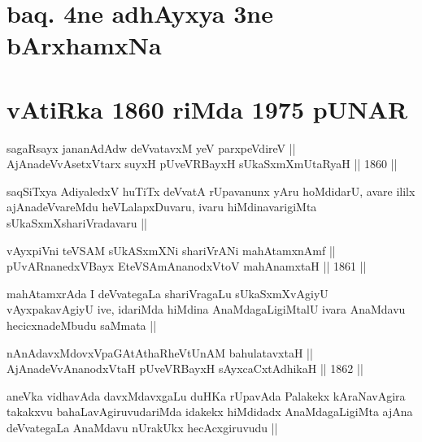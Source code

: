 \section*{baq. 4ne adhAyxya 3ne bArxhamxNa}

\section*{vAtiRka 1860 riMda 1975 pUNAR}


\begin{shl}
sagaRsayx jananAdAdw deVvatavxM yeV parxpeVdireV || \\
AjAnadeVvAsetxV\s tarx suyxH pUveVRBayxH sUkaSxmXmUtaRyaH ||  1860 ||  
\end{shl}

\begin{artha}
saqSiTxya AdiyaledxV huTiTx deVvatA rUpavanunx yAru hoMdidarU, avare
ililx ajAnadeVvareMdu heVLalapxDuvaru, ivaru hiMdinavarigiMta
sUkaSxmXshariVradavaru ||
\end{artha}


\begin{shl}
vAyxpiVni teVSAM sUkASxmXNi shariVrANi mahAtamxnAmf || \\
pUvARnanedxVBayx EteVSAmAnanodxV\s toV mahAnamxtaH ||  1861 ||  
\end{shl}

\begin{artha}
mahAtamxrAda I deVvategaLa shariVragaLu sUkaSxmXvAgiyU vAyxpakavAgiyU
ive, idariMda hiMdina AnaMdagaLigiMtalU ivara AnaMdavu hecicxnadeMbudu
saMmata ||
\end{artha}

\begin{shl}
nAnAdavxMdovxVpaGAtAthaRheVtUnAM bahulatavxtaH || \\
AjAnadeVvAnanodxV\s taH pUveVRBayxH sAyxcaCxtAdhikaH ||  1862 ||  
\end{shl}

\begin{artha}
aneVka vidhavAda davxMdavxgaLu duHKa rUpavAda Palakekx kAraNavAgira
takakxvu bahaLavAgiruvudariMda idakekx hiMdidadx AnaMdagaLigiMta ajAna
deVvategaLa AnaMdavu nUrakUkx hecAcxgiruvudu ||
\end{artha}


